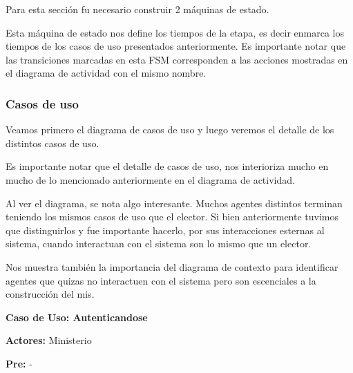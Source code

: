 Para esta sección fu necesario construir 2 máquinas de estado.

\begin{figure}[H]
\centering
\end{figure}

Esta máquina de estado nos define los tiempos de la etapa, es decir enmarca los tiempos de los casos de uso presentados anteriormente. Es importante notar que las transiciones marcadas en esta FSM corresponden a las acciones mostradas en el diagrama de actividad con el mismo nombre.

\begin{figure}[H]
\centering
\end{figure}



\subsubsection{Casos de uso}

Veamos primero el diagrama de casos de uso y luego veremos el detalle de los distintos casos de uso.

Es importante notar que el detalle de casos de uso, nos interioriza mucho en mucho de lo mencionado anteriormente en el diagrama de actividad. 


Al ver el diagrama, se nota algo interesante. Muchos agentes distintos terminan teniendo los mismos casos de uso que el elector. Si bien anteriormente tuvimos que distinguirlos y fue importante hacerlo, por sus interacciones esternas al sistema, cuando interactuan con el sistema son lo mismo que un elector.

Nos muestra también la importancia del diagrama de contexto para identificar agentes que quizas no interactuen con el sistema pero son escenciales a la construcción del mis.

\textbf{Caso de Uso: Autenticandose}

\textbf{Actores:} Ministerio

\textbf{Pre:} -

